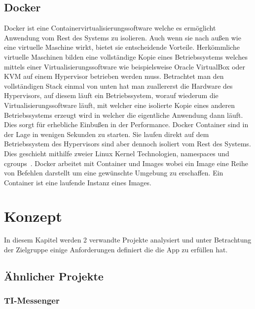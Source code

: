     \section{Docker}\label{sec:docker}
    Docker ist eine Containervirtualisierungssoftware welche es ermöglicht Anwendung vom Rest des Systems zu isolieren.
    Auch wenn sie nach außen wie eine virtuelle Maschine wirkt, bietet sie entscheidende Vorteile.
    Herkömmliche virtuelle Maschinen bilden eine vollständige Kopie eines Betriebssystems welches mittels einer Virtualisierungssoftware wie beispielsweise Oracle VirtualBox oder KVM auf einem Hypervisor betrieben werden muss.
    Betrachtet man den vollständigen Stack einmal von unten hat man zuallererst die Hardware des Hypervisors, auf diesem läuft ein Betriebssystem, worauf wiederum die Virtualisierungssoftware läuft, mit welcher eine isolierte Kopie eines anderen Betriebssystems erzeugt wird in welcher die eigentliche Anwendung dann läuft.
    Dies sorgt für erhebliche Einbußen in der Performance.
    Docker Container sind in der Lage in wenigen Sekunden zu starten.
    Sie laufen direkt auf dem Betriebssystem des Hypervisors sind aber dennoch isoliert vom Rest des Systems.
    Dies geschieht mithilfe zweier Linux Kernel Technologien, namespaces und cgroups~\cite{docker}.
    Docker arbeitet mit Container und Images wobei ein Image eine Reihe von Befehlen darstellt um eine gewünschte Umgebung zu erschaffen.
    Ein Container ist eine laufende Instanz eines Images.


    \chapter{Konzept}\label{ch:konzept}
    In diesem Kapitel werden 2 verwandte Projekte analysiert und unter Betrachtung der Zielgruppe einige Anforderungen definiert die die App zu erfüllen hat.

    \section{Ähnlicher Projekte}\label{sec:analyse-ahnlicher-projekte}

    \subsection{TI-Messenger}\label{subsec:ti-messenger}

